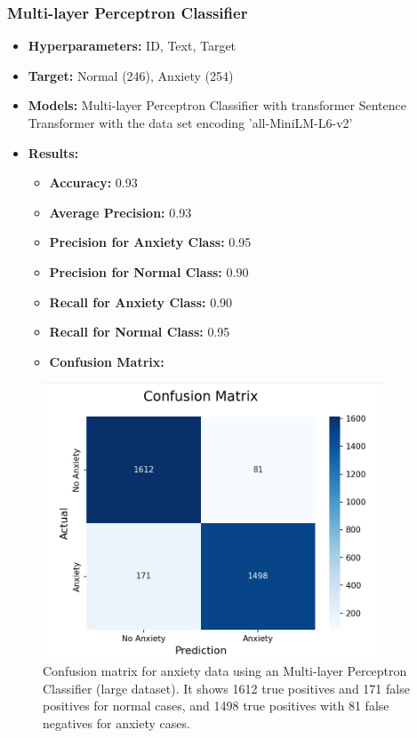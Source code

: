 \documentclass[runningheads,a4paper,11pt]{report}
\begin{document}
\vspace{0.5cm} %

\subsubsection{Multi-layer Perceptron Classifier}
\label{section:mpl}

\begin{itemize}
    \item \textbf{Hyperparameters:} ID, Text, Target
    \item \textbf{Target:} Normal (246), Anxiety (254)
    \item \textbf{Models:} Multi-layer Perceptron Classifier with transformer Sentence Transformer with the data set encoding 'all-MiniLM-L6-v2'
    \item \textbf{Results:}
    \begin{itemize}
        \item \textbf{Accuracy:} 0.93
        \item \textbf{Average Precision:} 0.93
        \item \textbf{Precision for Anxiety Class:} 0.95
        \item \textbf{Precision for Normal Class:} 0.90
        \item \textbf{Recall for Anxiety Class:} 0.90
        \item \textbf{Recall for Normal Class:} 0.95
        \item \textbf{Confusion Matrix:}
    \end{itemize}
\end{itemize}

\begin{figure}[h]
\centering
\includegraphics[width=0.9\textwidth]{Anxiety-Data-MLPClassifier.jpg}
\caption[Confusion matrix for anxiety data (Multi-layer Perceptron Classifier)]{\centering Confusion matrix for anxiety data using an Multi-layer Perceptron Classifier (large dataset). It shows 1612 true positives and 171 false positives for normal cases, and 1498 true positives with 81 false negatives for anxiety cases.}
\end{figure}
\end{document}
